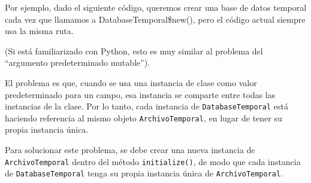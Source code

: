 \documentclass[
]{book}
\newenvironment{Shaded}{\begin{snugshade}}{\end{snugshade}}
\newcommand{\AttributeTok}[1]{\textcolor[rgb]{0.13,0.29,0.53}{#1}}
\newcommand{\ConstantTok}[1]{\textcolor[rgb]{0.56,0.35,0.01}{#1}}
\newcommand{\ControlFlowTok}[1]{\textcolor[rgb]{0.13,0.29,0.53}{\textbf{#1}}}
\newcommand{\DocumentationTok}[1]{\textcolor[rgb]{0.56,0.35,0.01}{\textbf{\textit{#1}}}}
\newcommand{\FunctionTok}[1]{\textcolor[rgb]{0.13,0.29,0.53}{\textbf{#1}}}
\newcommand{\NormalTok}[1]{#1}
\newcommand{\OtherTok}[1]{\textcolor[rgb]{0.56,0.35,0.01}{#1}}
\newcommand{\SpecialCharTok}[1]{\textcolor[rgb]{0.81,0.36,0.00}{\textbf{#1}}}
\newcommand{\StringTok}[1]{\textcolor[rgb]{0.31,0.60,0.02}{#1}}
\begin{document}
Por ejemplo, dado el siguiente código, queremos crear una base de datos temporal cada vez que llamamos a DatabaseTemporal\$new(), pero el código actual siempre usa la misma ruta.

\begin{Shaded}
\end{Shaded}

(Si está familiarizado con Python, esto es muy similar al problema del ``argumento predeterminado mutable'').

El problema es que, cuando se usa una instancia de clase como valor predeterminado para un campo, esa instancia se comparte entre todas las instancias de la clase. Por lo tanto, cada instancia de \texttt{DatabaseTemporal} está haciendo referencia al mismo objeto \texttt{ArchivoTemporal}, en lugar de tener su propia instancia única.

Para solucionar este problema, se debe crear una nueva instancia de \texttt{ArchivoTemporal} dentro del método \texttt{initialize()}, de modo que cada instancia de \texttt{DatabaseTemporal} tenga su propia instancia única de \texttt{ArchivoTemporal}.
\end{document}
